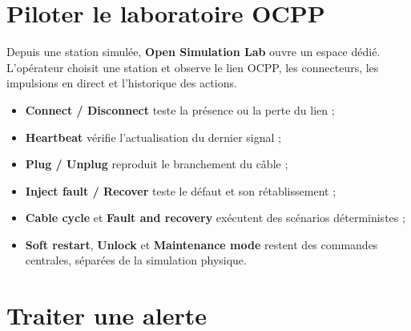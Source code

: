 
\section{Piloter le laboratoire OCPP}

Depuis une station simulée, \textbf{Open Simulation Lab} ouvre un espace dédié.
L'opérateur choisit une station et observe le lien OCPP, les connecteurs, les
impulsions en direct et l'historique des actions.

\begin{itemize}[leftmargin=1.6em]
  \item \textbf{Connect / Disconnect} teste la présence ou la perte du lien ;
  \item \textbf{Heartbeat} vérifie l'actualisation du dernier signal ;
  \item \textbf{Plug / Unplug} reproduit le branchement du câble ;
  \item \textbf{Inject fault / Recover} teste le défaut et son rétablissement ;
  \item \textbf{Cable cycle} et \textbf{Fault and recovery} exécutent des
  scénarios déterministes ;
  \item \textbf{Soft restart}, \textbf{Unlock} et \textbf{Maintenance mode}
  restent des commandes centrales, séparées de la simulation physique.
\end{itemize}


\section{Traiter une alerte}


